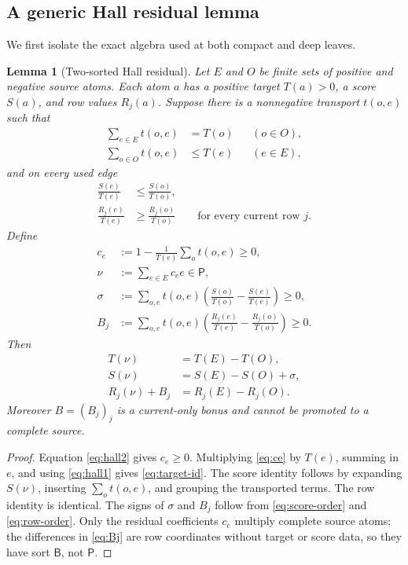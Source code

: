 \documentclass[11pt]{article}
\newtheorem{lemma}[theorem]{Lemma}
\theoremstyle{definition}
\theoremstyle{remark}
\newcommand{\1}{\mathbf 1}
\newcommand{\Src}{\mathsf P}
\newcommand{\Bonus}{\mathsf B}
\begin{document}
\subsection{A generic Hall residual lemma}

We first isolate the exact algebra used at both compact and deep leaves.

\begin{lemma}[Two-sorted Hall residual]\label{lem:hall-residual}
Let \(E\) and \(O\) be finite sets of positive and negative source atoms.  Each atom \(a\) has a positive target \(T(a)>0\), a score \(S(a)\), and row values \(R_j(a)\).  Suppose there is a nonnegative transport \(t(o,e)\) such that
\begin{align}
\sum_{e\in E}t(o,e)&=T(o) &&(o\in O),\label{eq:hall1}\\
\sum_{o\in O}t(o,e)&\le T(e) &&(e\in E),\label{eq:hall2}
\end{align}
and on every used edge
\begin{align}
\frac{S(e)}{T(e)}&\le \frac{S(o)}{T(o)},\label{eq:score-order}\\
\frac{R_j(e)}{T(e)}&\ge \frac{R_j(o)}{T(o)}\qquad\text{for every current row }j.\label{eq:row-order}
\end{align}
Define
\begin{align}
c_e&:=1-\frac1{T(e)}\sum_o t(o,e)\ge0,\label{eq:ce}\\
\nu&:=\sum_{e\in E}c_e e\in\Src,\label{eq:nu}\\
\sigma&:=\sum_{o,e}t(o,e)\left(\frac{S(o)}{T(o)}-\frac{S(e)}{T(e)}\right)\ge0,\label{eq:sigma}\\
B_j&:=\sum_{o,e}t(o,e)\left(\frac{R_j(e)}{T(e)}-\frac{R_j(o)}{T(o)}\right)\ge0.\label{eq:Bj}
\end{align}
Then
\begin{align}
T(\nu)&=T(E)-T(O),\label{eq:target-id}\\
S(\nu)&=S(E)-S(O)+\sigma,\label{eq:score-id}\\
R_j(\nu)+B_j&=R_j(E)-R_j(O).\label{eq:row-id}
\end{align}
Moreover \(B=(B_j)_j\) is a current-only bonus and cannot be promoted to a complete source.
\end{lemma}

\begin{proof}
Equation \eqref{eq:hall2} gives \(c_e\ge0\).  Multiplying \eqref{eq:ce} by \(T(e)\), summing in \(e\), and using \eqref{eq:hall1} gives \eqref{eq:target-id}.  The score identity follows by expanding \(S(\nu)\), inserting \(\sum_o t(o,e)\), and grouping the transported terms.  The row identity is identical.  The signs of \(\sigma\) and \(B_j\) follow from \eqref{eq:score-order} and \eqref{eq:row-order}.  Only the residual coefficients \(c_e\) multiply complete source atoms; the differences in \eqref{eq:Bj} are row coordinates without target or score data, so they have sort \(\Bonus\), not \(\Src\).
\end{proof}
\end{document}
